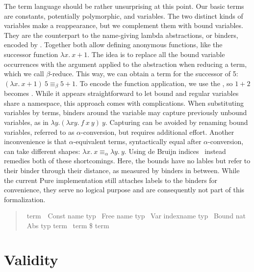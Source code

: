 The term language should be rather unsurprising at this point.
Our basic terms are constants, potentially polymorphic, and variables.
The two distinct kinds of variables make a reappearance, but we complement them with bound variables.
They are the counterpart to the name-giving lambda abstractions, or binders, encoded by .
Together both allow defining anonymous functions, like the successor function \(\lambda x.\ x + 1\).
The idea is to replace all the bound variable occurrences with the argument applied to the abstraction when reducing a term, which we call \(\beta\)-reduce.
This way, we can obtain a term for the successor of 5: \((\lambda x.\ x + 1)\ 5 \equiv_\beta 5 + 1\).
To encode the function application, we use the \isa{\$}, so \(1 + 2\) becomes .
While it appears straightforward to let bound and regular variables share a namespace, this approach comes with complications.
When substituting variables by terms, binders around the variable may capture previously unbound variables, as in \(\lambda y. (\lambda x y.\ f\ x\ y)\ y\).
Capturing can be avoided by renaming bound variables, referred to as \(\alpha\)-conversion, but requires additional effort.
Another inconvenience is that \(\alpha\)-equivalent terms, syntactically equal after \(\alpha\)-conversion, can take different shapes: \(\lambda x.\ x \equiv_\alpha \lambda y.\ y\).
Using de Bruijn indices~\parencite{DeBruijn72} instead remedies both of these shortcomings.
Here, the bounds have no lables but refer to their binder through their distance, as measured by binders in between.
While the current Pure implementation still attaches labels to the binders for convenience, they serve no logical purpose and are consequently not part of this formalization.

\begin{quote}
    \begin{isabelle}
        \ term\ {\isacharequal}\ Const name typ\isanewline
        \isaindent{\ \ }{\isacharbar}\ Free name typ\isanewline
        \isaindent{\ \ }{\isacharbar}\ Var indexname typ\isanewline
        \isaindent{\ \ }{\isacharbar}\ Bound nat\isanewline
        \isaindent{\ \ }{\isacharbar}\ Abs typ term\isanewline
        \isaindent{\ \ }{\isacharbar}\ term \$ term
    \end{isabelle}
\end{quote}

\section{Validity}
\label{sec:validity}

